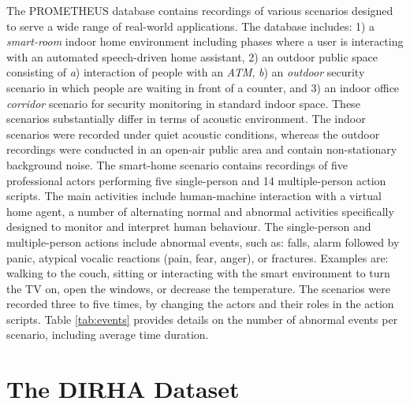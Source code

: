 The PROMETHEUS database \cite{ntalampiras:probabilistic} contains recordings of various scenarios designed to serve a wide range of real-world applications. The database includes: 1) a \textit{smart-room} indoor home environment including phases where a user is interacting with an automated speech-driven home assistant, 2) an outdoor public space consisting of \textit{a}) interaction of people with an \textit{ATM}, \textit{b}) an \textit{outdoor} security scenario in which people are waiting in front of a counter, and 3) an  indoor office \textit{corridor} scenario for security monitoring in standard indoor space. 
These scenarios substantially differ in terms of acoustic environment. The indoor scenarios were recorded under quiet acoustic conditions, whereas the outdoor recordings were conducted in an open-air public area and contain non-stationary background noise.   
The smart-home scenario contains recordings of five professional actors performing five single-person and 14 multiple-person action scripts. The main activities include human-machine interaction with a virtual home agent, a number of alternating normal and abnormal activities specifically designed to monitor and interpret human behaviour. The single-person and multiple-person actions include abnormal events, such as: falls, alarm followed by panic, atypical vocalic reactions (pain, fear, anger), or fractures. Examples are: walking to the couch, sitting or interacting with the smart environment to turn the TV on, open the windows, or decrease the temperature. The scenarios were recorded three to five times, by changing the actors and their roles in the action scripts.
Table \ref{tab:events} provides details on the number of abnormal events per scenario, including average time duration.


\section{The DIRHA Dataset}
\label{sec:dataset}

